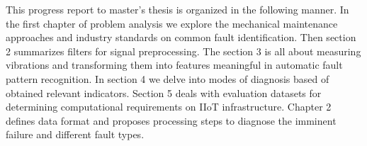 This progress report to master's thesis is organized in the following manner. In the first chapter of problem analysis we explore the mechanical maintenance approaches and industry standards on common fault identification. Then section 2 summarizes filters for signal preprocessing. The section 3 is all about measuring vibrations and transforming them into features meaningful in automatic fault pattern recognition. In section 4 we delve into modes of diagnosis based of obtained relevant indicators. Section 5 deals with evaluation datasets for determining computational requirements on IIoT infrastructure. Chapter 2 defines data format and proposes processing steps to diagnose the imminent failure and different fault types.
